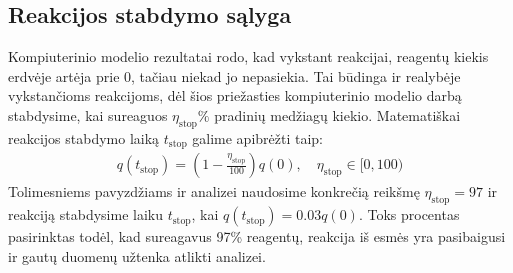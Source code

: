 \subsection{Reakcijos stabdymo sąlyga}
Kompiuterinio modelio rezultatai rodo, kad vykstant reakcijai, reagentų kiekis erdvėje artėja prie 0, tačiau niekad jo nepasiekia. Tai būdinga ir realybėje vykstančioms reakcijoms, dėl šios priežasties kompiuterinio modelio darbą stabdysime, kai sureaguos $\eta_\text{stop}\%$ pradinių medžiagų kiekio. Matematiškai reakcijos stabdymo laiką $t_\text{stop}$ galime apibrėžti taip:
\begin{align}
  q(t_\text{stop})=\left(1-\frac{\eta_\text{stop}}{100}\right)q(0),\quad \eta_\text{stop}\in[0, 100)
\end{align}
Tolimesniems pavyzdžiams ir analizei naudosime konkrečią reikšmę $\eta_\text{stop}=97$ ir reakciją stabdysime laiku $t_\text{stop}$, kai $q(t_\text{stop})=0.03q(0)$. Toks procentas pasirinktas todėl, kad sureagavus 97\% reagentų, reakcija iš esmės yra pasibaigusi ir gautų duomenų užtenka atlikti analizei.
